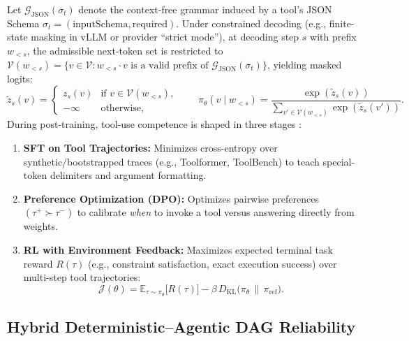 \documentclass[../../../../master.tex]{subfiles}
\begin{document}
\begin{coremath}
Let $\mathcal{G}_{\text{JSON}}(\sigma_t)$ denote the context-free grammar induced by a tool's JSON Schema $\sigma_t = (\text{inputSchema}, \text{required})$. Under constrained decoding (e.g., finite-state masking in vLLM or provider ``strict mode''), at decoding step $s$ with prefix $w_{<s}$, the admissible next-token set is restricted to $\mathcal{V}(w_{<s}) = \{v \in \mathcal{V} : w_{<s} \cdot v \text{ is a valid prefix of } \mathcal{G}_{\text{JSON}}(\sigma_t)\}$, yielding masked logits:
\begin{equation}
  \tilde{z}_s(v) =
  \begin{cases}
    z_s(v) & \text{if } v \in \mathcal{V}(w_{<s}), \\
    -\infty & \text{otherwise,}
  \end{cases}
  \qquad
  \pi_\theta(v \mid w_{<s}) = \frac{\exp(\tilde{z}_s(v))}{\sum_{v' \in \mathcal{V}(w_{<s})} \exp(\tilde{z}_s(v'))}.
  \label{eq:mcp:constrained_decoding}
\end{equation}
During post-training, tool-use competence is shaped in three stages :
\begin{enumerate}
  \item \textbf{SFT on Tool Trajectories:} Minimizes cross-entropy over synthetic/bootstrapped traces (e.g., Toolformer, ToolBench) to teach special-token delimiters and argument formatting.
  \item \textbf{Preference Optimization (DPO):} Optimizes pairwise preferences $(\tau^+ \succ \tau^-)$ to calibrate \emph{when} to invoke a tool versus answering directly from weights.
  \item \textbf{RL with Environment Feedback:} Maximizes expected terminal task reward $R(\tau)$ (e.g., constraint satisfaction, exact execution success) over multi-step tool trajectories:
  \begin{equation}
    \mathcal{J}(\theta) = \mathbb{E}_{\tau \sim \pi_\theta}\!\bigl[R(\tau)\bigr] - \beta \, D_{\mathrm{KL}}\!\bigl(\pi_\theta \,\|\, \pi_{\text{ref}}\bigr).
    \label{eq:mcp:rl_tool}
  \end{equation}
\end{enumerate}
\end{coremath}

\subsection{Hybrid Deterministic--Agentic DAG Reliability}
\end{document}
